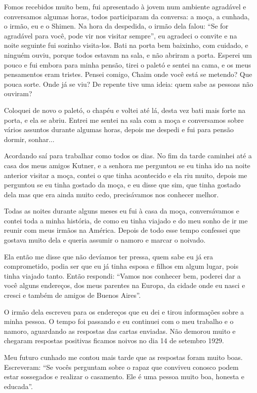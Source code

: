 Fomos recebidos muito bem, fui apresentado à jovem num ambiente
agradável e conversamos algumas horas, todos participaram da conversa: a
moça, a cunhada, o irmão, eu e o Shimen. Na hora da despedida, o irmão
dela falou: ``Se for agradável para você, pode vir nos visitar sempre'',
eu agradeci o convite e na noite seguinte fui sozinho visita-los. Bati
na porta bem baixinho, com cuidado, e ninguém ouviu, porque todos
estavam na sala, e não abriram a porta. Esperei um pouco e fui embora
para minha pensão, tirei o paletó e sentei na cama, e os meus
pensamentos eram tristes. Pensei comigo, Chaim onde você está se
metendo? Que pouca sorte. Onde já se viu? De repente tive uma ideia:
quem sabe as pessoas não ouviram?

Coloquei de novo o paletó, o chapéu e voltei até lá, desta vez bati mais
forte na porta, e ela se abriu. Entrei me sentei na sala com a moça e
conversamos sobre vários assuntos durante algumas horas, depois me
despedi e fui para pensão dormir, sonhar...

Acordando saí para trabalhar como todos os dias. No fim da tarde
caminhei até a casa dos meus amigos Kutner, e a senhora me perguntou se
eu tinha ido na noite anterior visitar a moça, contei o que tinha
acontecido e ela riu muito, depois me perguntou se eu tinha gostado da
moça, e eu disse que sim, que tinha gostado dela mas que era ainda muito
cedo, precisávamos nos conhecer melhor.

Todas as noites durante alguns meses eu fui à casa da moça,
conversávamos e contei toda a minha história, de como eu tinha viajado e
do meu sonho de ir me reunir com meus irmãos na América. Depois de todo
esse tempo confessei que gostava muito dela e queria assumir o namoro e
marcar o noivado.

Ela então me disse que não devíamos ter pressa, quem sabe eu já era
comprometido, podia ser que eu já tinha esposa e filhos em algum lugar,
pois tinha viajado tanto. Então respondi: ``Vamos nos conhecer bem,
poderei dar a você alguns endereços, dos meus parentes na Europa, da
cidade onde eu nasci e cresci e também de amigos de Buenos Aires''.

O irmão dela escreveu para os endereços que eu dei e tirou informações
sobre a minha pessoa. O tempo foi passando e eu continuei com o meu
trabalho e o namoro, aguardando as respostas das cartas enviadas. Não
demorou muito e chegaram respostas positivas ficamos noivos no dia 14 de
setembro 1929.

Meu futuro cunhado me contou mais tarde que as respostas foram muito
boas. Escreveram: ``Se vocês perguntam sobre o rapaz que conviveu
conosco podem estar sossegados e realizar o casamento. Ele é uma pessoa
muito boa, honesta e educada''.

